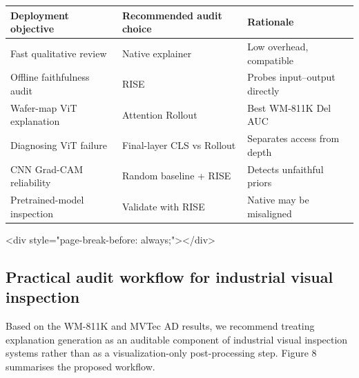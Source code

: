 \documentclass[11pt,a4paper]{article}
\begin{document}
\begin{tabular}{lll}
\toprule
Deployment objective & Recommended audit choice & Rationale \\
\midrule
Fast qualitative review & Native explainer & Low overhead, compatible \\
Offline faithfulness audit & RISE & Probes input--output directly \\
Wafer-map ViT explanation & Attention Rollout & Best WM-811K Del AUC \\
Diagnosing ViT failure & Final-layer CLS vs Rollout & Separates access from depth \\
CNN Grad-CAM reliability & Random baseline + RISE & Detects unfaithful priors \\
Pretrained-model inspection & Validate with RISE & Native may be misaligned \\
\bottomrule
\end{tabular}


<div style="page-break-before: always;"></div>

\clearpage
\subsection{Practical audit workflow for industrial visual inspection}

Based on the WM-811K and MVTec AD results, we recommend treating explanation generation as an auditable component of industrial visual inspection systems rather than as a visualization-only post-processing step. Figure 8 summarises the proposed workflow.
\end{document}
